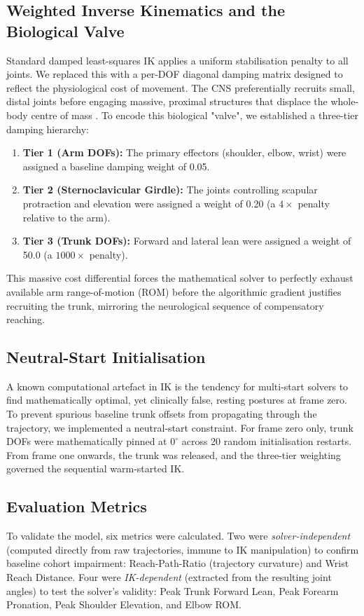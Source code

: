 \documentclass[12pt, a4paper]{article}
\begin{document}
\subsection{Weighted Inverse Kinematics and the Biological Valve}
Standard damped least-squares IK applies a uniform stabilisation penalty to all joints. We replaced this with a per-DOF diagonal damping matrix designed to reflect the physiological cost of movement. The CNS preferentially recruits small, distal joints before engaging massive, proximal structures that displace the whole-body centre of mass \cite{cirstea2000, dempster1955}. To encode this biological "valve", we established a three-tier damping hierarchy:

\begin{enumerate}
    \item \textbf{Tier 1 (Arm DOFs):} The primary effectors (shoulder, elbow, wrist) were assigned a baseline damping weight of 0.05.
    \item \textbf{Tier 2 (Sternoclavicular Girdle):} The joints controlling scapular protraction and elevation were assigned a weight of 0.20 (a $4\times$ penalty relative to the arm).
    \item \textbf{Tier 3 (Trunk DOFs):} Forward and lateral lean were assigned a weight of 50.0 (a $1000\times$ penalty).
\end{enumerate}

This massive cost differential forces the mathematical solver to perfectly exhaust available arm range-of-motion (ROM) before the algorithmic gradient justifies recruiting the trunk, mirroring the neurological sequence of compensatory reaching. 

\subsection{Neutral-Start Initialisation}
A known computational artefact in IK is the tendency for multi-start solvers to find mathematically optimal, yet clinically false, resting postures at frame zero. To prevent spurious baseline trunk offsets from propagating through the trajectory, we implemented a neutral-start constraint. For frame zero only, trunk DOFs were mathematically pinned at $0^{\circ}$ across 20 random initialisation restarts. From frame one onwards, the trunk was released, and the three-tier weighting governed the sequential warm-started IK. 

\subsection{Evaluation Metrics}
To validate the model, six metrics were calculated. Two were \textit{solver-independent} (computed directly from raw trajectories, immune to IK manipulation) to confirm baseline cohort impairment: Reach-Path-Ratio (trajectory curvature) and Wrist Reach Distance. Four were \textit{IK-dependent} (extracted from the resulting joint angles) to test the solver's validity: Peak Trunk Forward Lean, Peak Forearm Pronation, Peak Shoulder Elevation, and Elbow ROM. 
\end{document}
